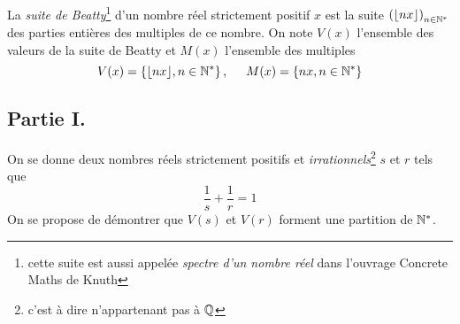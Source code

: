 La \emph{suite de Beatty}\footnote{cette suite est aussi appelée \emph{spectre d'un nombre réel} dans l'ouvrage Concrete Maths de Knuth} d'un nombre réel strictement positif $x$ est la suite $\left( \lfloor nx \rfloor\right) _{n\in \mathbb{N}^*}$ des parties entières des multiples de ce nombre. On note $V(x)$ l'ensemble des valeurs de la suite de Beatty et $M(x)$ l'ensemble des multiples
\begin{displaymath}
 V(x)=\left\lbrace \lfloor nx \rfloor , n\in \mathbb{N}^* \right\rbrace, \hspace{0.5cm} 
 M(x)=\left\lbrace  nx , n\in \mathbb{N}^* \right\rbrace
\end{displaymath}
\subsection*{Partie I.}
On se donne deux nombres réels strictement positifs et \emph{irrationnels}\footnote{c'est à dire n'appartenant pas à $\mathbb{Q}$} $s$ et $r$ tels que 
\begin{displaymath}
\frac{1}{s} + \frac{1}{r}=1 
\end{displaymath}
On se propose de démontrer que $V(s)$ et $V(r)$ forment une partition de $\mathbb{N}^*$.
